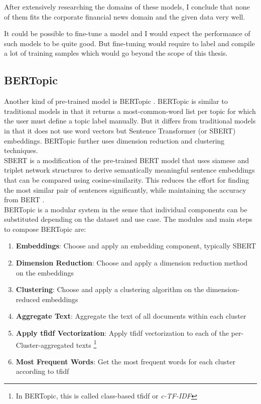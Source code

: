 After extensively researching the domains of these models, I conclude that none of them fits the corporate financial news domain and the given data very well.

It could be possible to fine-tune a model and I would expect the performance of such models to be quite good.
But fine-tuning would require to label and compile a lot of training samples which would go beyond the scope of this thesis.

\subsection{BERTopic}\label{subsec:bertopic}
Another kind of pre-trained model is BERTopic \cite{bertopic}.
BERTopic is similar to traditional models in that it returns a most-common-word list per topic for which the user must define a topic label manually.
But it differs from traditional models in that it does not use word vectors but Sentence Transformer (or SBERT) \cite{sentence-bert} embeddings.
BERTopic further uses dimension reduction and clustering techniques. \\
SBERT is a modification of the pre-trained \gls{BERT} model that uses siamese and triplet network structures to derive semantically meaningful sentence embeddings that can be compared using cosine-similarity.
This reduces the effort for finding the most similar pair of sentences significantly, while maintaining the accuracy from BERT \cite{sentence-bert}. \\


BERTopic \cite{bertopic} is a modular system in the sense that individual components can be substituted depending on the dataset and use case.
The modules and main steps to compose BERTopic \cite{bertopic} are:

\begin{enumerate}
    \item \textbf{Embeddings}: Choose and apply an embedding component, typically SBERT \cite{sentence-bert}
    \item \textbf{Dimension Reduction}: Choose and apply a dimension reduction method on the embeddings
    \item \textbf{Clustering}: Choose and apply a clustering algorithm on the dimension-reduced embeddings
    \item \textbf{Aggregate Text}: Aggregate the text of all documents within each cluster
    \item \textbf{Apply \gls{tfidf} Vectorization}:  Apply \gls{tfidf} vectorization to each of the per-Cluster-aggregated texts \footnote{In BERTopic, this is called class-based \gls{tfidf} or \emph{c-TF-IDF}}
    \item \textbf{Most Frequent Words}: Get the most frequent words for each cluster according to \gls{tfidf}
\end{enumerate}

